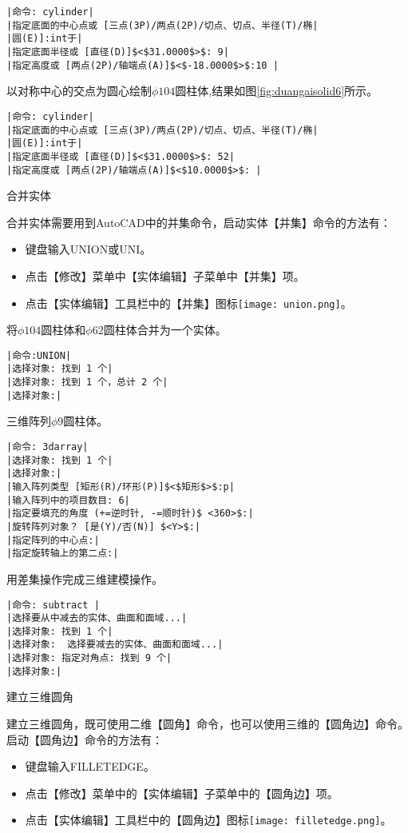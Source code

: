 \begin{procedure}
\begin{lstlisting}
|命令: cylinder|
|指定底面的中心点或 [三点(3P)/两点(2P)/切点、切点、半径(T)/椭|
|圆(E)]:int于|
|指定底面半径或 [直径(D)]$<$31.0000$>$: 9|
|指定高度或 [两点(2P)/轴端点(A)]$<$-18.0000$>$:10 |
\end{lstlisting}
以对称中心的交点为圆心绘制$\phi 104$圆柱体,结果如图\ref{fig:duangaisolid6}所示。
\begin{lstlisting}
|命令: cylinder|
|指定底面的中心点或 [三点(3P)/两点(2P)/切点、切点、半径(T)/椭|
|圆(E)]:int于|
|指定底面半径或 [直径(D)]$<$31.0000$>$: 52|
|指定高度或 [两点(2P)/轴端点(A)]$<$10.0000$>$: |
\end{lstlisting}
\item 合并实体

合并实体需要用到AutoCAD中的并集命令，启动实体【并集】命令的方法有：
\begin{itemize}
\item 键盘输入UNION或UNI。
\item 点击【修改】菜单中【实体编辑】子菜单中【并集】项。
\item 点击【实体编辑】工具栏中的【并集】图标\texttt{[image: union.png]}。
\end{itemize}
将$\phi 104$圆柱体和$\phi 62$圆柱体合并为一个实体。
\begin{lstlisting}
|命令:UNION|
|选择对象: 找到 1 个|
|选择对象: 找到 1 个，总计 2 个|
|选择对象:|
\end{lstlisting}
\item 三维阵列$\phi 9$圆柱体。
\begin{lstlisting}
|命令: 3darray|
|选择对象: 找到 1 个|
|选择对象:|
|输入阵列类型 [矩形(R)/环形(P)]$<$矩形$>$:p|
|输入阵列中的项目数目: 6|
|指定要填充的角度 (+=逆时针, -=顺时针)$ <360>$:|
|旋转阵列对象？ [是(Y)/否(N)] $<Y>$:|
|指定阵列的中心点:|
|指定旋转轴上的第二点:|
\end{lstlisting}
\item 用差集操作完成三维建模操作。
\begin{lstlisting}
|命令: subtract |
|选择要从中减去的实体、曲面和面域...|
|选择对象: 找到 1 个|
|选择对象:  选择要减去的实体、曲面和面域...|
|选择对象: 指定对角点: 找到 9 个|
|选择对象:|
\end{lstlisting}
\item 建立三维圆角

建立三维圆角，既可使用二维【圆角】命令，也可以使用三维的【圆角边】命令。启动【圆角边】命令的方法有：
\begin{itemize}
\item 键盘输入FILLETEDGE。
\item 点击【修改】菜单中的【实体编辑】子菜单中的【圆角边】项。
\item 点击【实体编辑】工具栏中的【圆角边】图标\texttt{[image: filletedge.png]}。
\end{itemize} 


\end{procedure}
